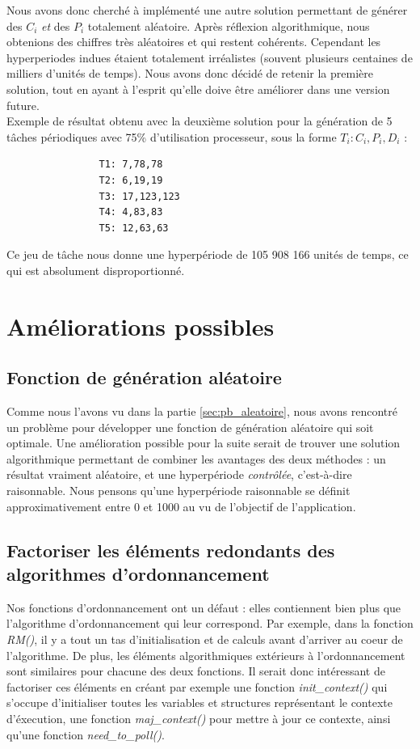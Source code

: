 			Nous avons donc cherché à implémenté une autre solution permettant de générer des $C_i$ \emph{et} des $P_i$ totalement aléatoire. Après réflexion algorithmique, nous obtenions des chiffres très aléatoires et qui restent cohérents. Cependant les hyperperiodes indues étaient totalement irréalistes (souvent plusieurs centaines de milliers d'unités de temps). Nous avons donc décidé de retenir la première solution, tout en ayant à l'esprit qu'elle doive être améliorer dans une version future.\\
			
			Exemple de résultat obtenu avec la deuxième solution pour la génération de 5 tâches périodiques avec 75\% d'utilisation processeur, sous la forme $T_i: C_i,P_i,D_i$ :
			\begin{lstlisting}
				T1: 7,78,78
				T2: 6,19,19
				T3: 17,123,123
				T4: 4,83,83
				T5: 12,63,63
			\end{lstlisting}
			Ce jeu de tâche nous donne une hyperpériode de 105 908 166 unités de temps, ce qui est absolument disproportionné.
	
	\section{Améliorations possibles}
		\subsection{Fonction de génération aléatoire}
			Comme nous l'avons vu dans la partie \ref{sec:pb_aleatoire}, nous avons rencontré un problème pour développer une fonction de génération aléatoire qui soit optimale. Une amélioration possible pour la suite serait de trouver une solution algorithmique permettant de combiner les avantages des deux méthodes : un résultat vraiment aléatoire, et une hyperpériode \emph{contrôlée}, c'est-à-dire raisonnable. Nous pensons qu'une hyperpériode raisonnable se définit approximativement entre 0 et 1000 au vu de l'objectif de l'application.
			
		\subsection{Factoriser les éléments redondants des algorithmes d'ordonnancement}
			Nos fonctions d'ordonnancement ont un défaut : elles contiennent bien plus que l'algorithme d'ordonnancement qui leur correspond. Par exemple, dans la fonction \emph{RM()}, il y a tout un tas d'initialisation et de calculs avant d'arriver au coeur de l'algorithme. De plus, les éléments algorithmiques extérieurs à l'ordonnancement sont similaires pour chacune des deux fonctions. Il serait donc intéressant de factoriser ces éléments en créant par exemple une fonction \emph{init\_context()} qui s'occupe d'initialiser toutes les variables et structures représentant le contexte d'éxecution, une fonction \emph{maj\_context()} pour mettre à jour ce contexte, ainsi qu'une fonction \emph{need\_to\_poll()}.\\
			
